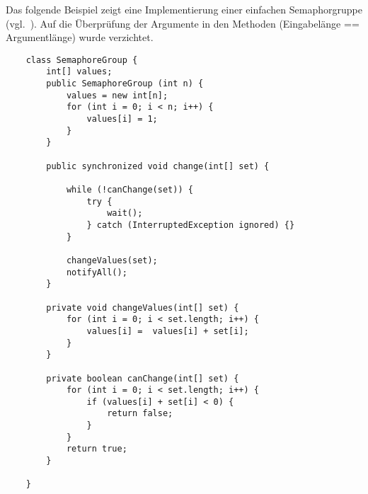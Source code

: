 \noindent
Das folgende Beispiel zeigt eine Implementierung einer einfachen Semaphorgruppe (vgl.~\cite[110, Listing 3.5]{Oec22}).
Auf die Überprüfung der Argumente in den Methoden (Eingabelänge == Argumentlänge) wurde verzichtet.

\newpage
\begin{verbatim}
    class SemaphoreGroup {
        int[] values;
        public SemaphoreGroup (int n) {
            values = new int[n];
            for (int i = 0; i < n; i++) {
                values[i] = 1;
            }
        }

        public synchronized void change(int[] set) {

            while (!canChange(set)) {
                try {
                    wait();
                } catch (InterruptedException ignored) {}
            }

            changeValues(set);
            notifyAll();
        }

        private void changeValues(int[] set) {
            for (int i = 0; i < set.length; i++) {
                values[i] =  values[i] + set[i];
            }
        }

        private boolean canChange(int[] set) {
            for (int i = 0; i < set.length; i++) {
                if (values[i] + set[i] < 0) {
                    return false;
                }
            }
            return true;
        }

    }
\end{verbatim}
